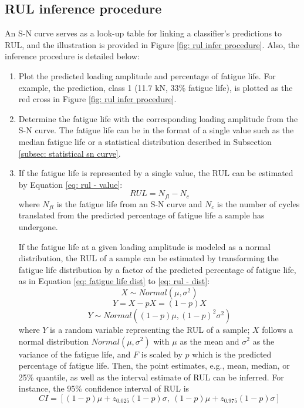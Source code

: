 \subsection{RUL inference procedure}
An S-N curve serves as a look-up table for linking a classifier's predictions to RUL, and the illustration is provided in Figure \ref{fig: rul infer procedure}. Also, the inference procedure is detailed below:
\begin{enumerate}
    \item Plot the predicted loading amplitude and percentage of fatigue life. For example, the prediction, class 1 (11.7 kN, 33\% fatigue life), is plotted as the red cross in Figure \ref{fig: rul infer procedure}.
    \item Determine the fatigue life with the corresponding loading amplitude from the S-N curve. The fatigue life can be in the format of a single value such as the median fatigue life or a statistical distribution described in Subsection \ref{subsec: statistical sn curve}.
    \item If the fatigue life is represented by a single value, the RUL can be estimated by Equation \eqref{eq: rul - value}: 
    \begin{equation}
        \label{eq: rul - value}
        RUL = N_{fl} - N_{c}
    \end{equation}
    where $N_{fl}$ is the fatigue life from an S-N curve and $N_c$ is the number of cycles translated from the predicted percentage of fatigue life a sample has undergone.

    If the fatigue life at a given loading amplitude is modeled as a normal distribution, the RUL of a sample can be estimated by transforming the fatigue life distribution by a factor of the predicted percentage of fatigue life, as in Equation \eqref{eq: fatigue life dist} to \eqref{eq: rul - dist}:
    \begin{equation}
        \label{eq: fatigue life dist}
        X \sim Normal(\mu, \sigma^2)
    \end{equation}
    \begin{equation}
        \label{eq: rul transform}
        Y = X - pX = (1 - p)X
    \end{equation}
    \begin{equation}
        \label{eq: rul - dist}
        Y \sim Normal((1-p)\mu, (1-p)^2\sigma^2)
    \end{equation}
    where $Y$ is a random variable representing the RUL of a sample; $X$ follows a normal distribution $Normal (\mu, \sigma^2)$ with $\mu$ as the mean and $\sigma^2$ as the variance of the fatigue life, and $F$ is scaled by $p$ which is the predicted percentage of fatigue life. Then, the point estimates, e.g., mean, median, or 25\% quantile, as well as the interval estimate of RUL can be inferred. For instance, the 95\% confidence interval of RUL is
    \begin{equation}
        CI = [(1-p)\mu + z_{0.025} (1-p) \sigma,\ (1-p)\mu + z_{0.975} (1-p) \sigma]
    \end{equation}
\end{enumerate}

